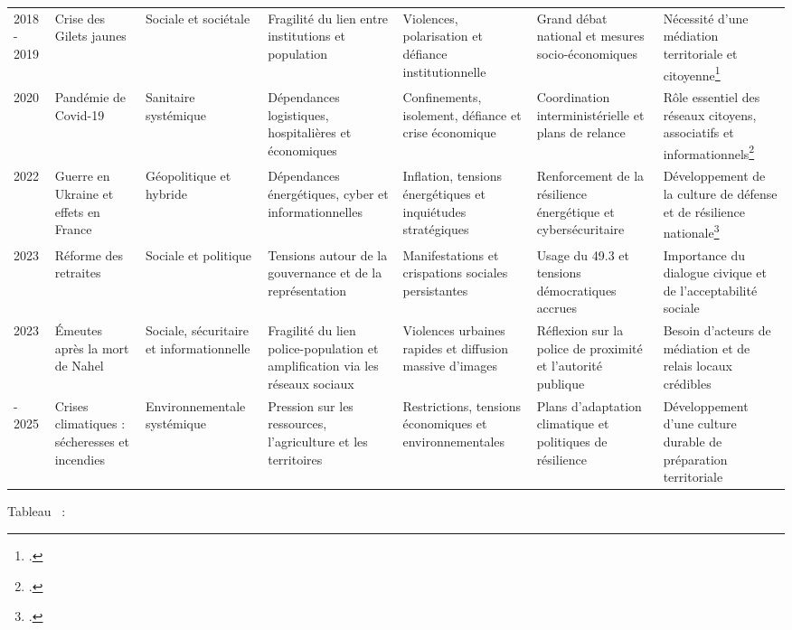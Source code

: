 \begin{xltabular}{\linewidth}{@{}
L{1.1cm}
L{2.35cm}
L{2.25cm}
Z
Z
Z
Z
@{}}
2018 - 2019 &
Crise des Gilets jaunes &
Sociale et sociétale &
Fragilité du lien entre institutions et population &
Violences, polarisation et défiance institutionnelle &
Grand débat national et mesures socio-économiques &
Nécessité d'une médiation territoriale et citoyenne\footnote{\cite{AN:2019:Gilets_Jaunes}.} \\
\addlinespace

2020 &
Pandémie de Covid-19 &
Sanitaire systémique &
Dépendances logistiques, hospitalières et économiques &
Confinements, isolement, défiance et crise économique &
Coordination interministérielle et plans de relance &
Rôle essentiel des réseaux citoyens, associatifs et informationnels\footnote{\cite{AN:2020:Covid}.} \\
\addlinespace

2022 &
Guerre en Ukraine et effets en France &
Géopolitique et hybride &
Dépendances énergétiques, cyber et informationnelles &
Inflation, tensions énergétiques et inquiétudes stratégiques &
Renforcement de la résilience énergétique et cybersécuritaire &
Développement de la culture de défense et de résilience nationale\footnote{\cite{economie_gouv_resilience_ukraine}.} \\
\addlinespace

2023 &
Réforme des retraites &
Sociale et politique &
Tensions autour de la gouvernance et de la représentation &
Manifestations et crispations sociales persistantes &
Usage du 49.3 et tensions démocratiques accrues &
Importance du dialogue civique et de l'acceptabilité sociale \\
\addlinespace

2023 &
Émeutes après la mort de Nahel &
Sociale, sécuritaire et informationnelle &
Fragilité du lien police-population et amplification via les réseaux sociaux &
Violences urbaines rapides et diffusion massive d'images &
Réflexion sur la police de proximité et l'autorité publique &
Besoin d'acteurs de médiation et de relais locaux crédibles \\
\addlinespace

 - 2025 &
Crises climatiques : sécheresses et incendies &
Environnementale systémique &
Pression sur les ressources, l'agriculture et les territoires &
Restrictions, tensions économiques et environnementales &
Plans d'adaptation climatique et politiques de résilience &
Développement d'une culture durable de préparation territoriale \\
\bottomrule

\end{xltabular}
\par\nopagebreak\vspace{0.4em}
\begin{center}
\normalsize
{}%
\label{tab:crises_majeures}%
\label{tab:crises_majeures_page_fin}%
%
Tableau~\thetable{} : \titreTableauCrisesMajeures
\end{center}
\endgroup
